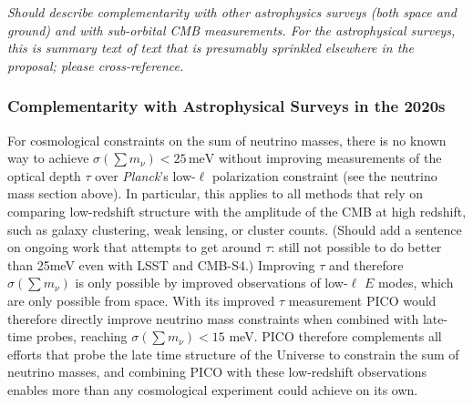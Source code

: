 \documentclass[PICOReport.tex]{subfiles}
\begin{document}
 {\it Should describe complementarity with other astrophysics surveys (both space and ground) and with 
 sub-orbital CMB measurements.  For the astrophysical surveys, this is summary text of text that is presumably 
 sprinkled elsewhere in the proposal; please cross-reference.}

 \subsubsection{Complementarity with Astrophysical Surveys in the 2020s}

 For cosmological constraints on the sum of neutrino masses, there is no known way to achieve $\sigma(\sum m_\nu)<25\,\mathrm{meV}$ without improving measurements of the optical depth $\tau$ over {\it Planck}'s low-$\ell$ polarization constraint (see the neutrino mass section above).
 In particular, this applies to all methods that rely on comparing low-redshift structure with the amplitude of the CMB at high redshift, such as galaxy clustering, weak lensing, or cluster counts.
 (Should add a sentence on ongoing work that attempts to get around $\tau$: still not possible to do better than 25meV even with LSST and CMB-S4.)
 Improving $\tau$ and therefore $\sigma(\sum m_\nu)$ is only possible by improved observations of low-$\ell$ $E$ modes, which are only possible from space.
 With its improved $\tau$ measurement PICO would therefore directly improve neutrino mass constraints when combined with late-time probes, reaching $\sigma(\sum m_\nu)<15$ meV.  
 PICO therefore complements all efforts that probe the late time structure of the Universe to constrain the sum of neutrino masses, and combining PICO with these low-redshift observations enables more than any cosmological experiment could achieve on its own.
  
\end{document}
